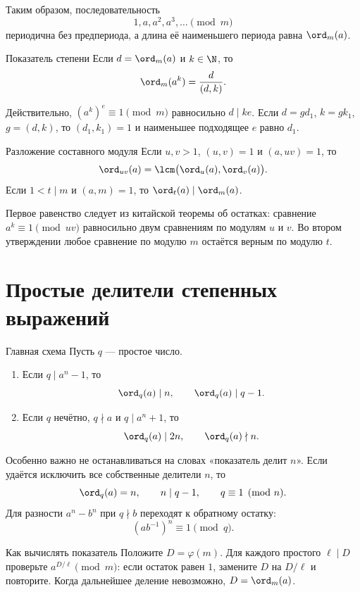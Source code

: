 Таким образом, последовательность
\[
  1,a,a^2,a^3,\ldots\pmod m
\]
периодична без предпериода, а длина её наименьшего периода равна
$\ord_m(a)$.

\begin{theorembox}{Показатель степени}
Если $d=\ord_m(a)$ и $k\in\N$, то
\[
  \ord_m(a^k)=\frac d{(d,k)}.
\]
\end{theorembox}

Действительно, $(a^k)^e\equiv1\pmod m$ равносильно $d\mid ke$.
Если $d=gd_1$, $k=gk_1$, $g=(d,k)$, то $(d_1,k_1)=1$ и наименьшее
подходящее $e$ равно $d_1$.

\begin{theorembox}{Разложение составного модуля}
Если $u,v>1$, $(u,v)=1$ и $(a,uv)=1$, то
\[
  \ord_{uv}(a)
  =\lcm\bigl(\ord_u(a),\ord_v(a)\bigr).
\]
Если $1<t\mid m$ и $(a,m)=1$, то
$\ord_t(a)\mid\ord_m(a)$.
\end{theorembox}

Первое равенство следует из китайской теоремы об остатках: сравнение
$a^k\equiv1\pmod{uv}$ равносильно двум сравнениям по модулям $u$ и
$v$. Во втором утверждении любое сравнение по модулю $m$ остаётся
верным по модулю $t$.

\section{Простые делители степенных выражений}

\begin{theorembox}{Главная схема}
Пусть $q$ --- простое число.
\begin{enumerate}
  \item Если $q\mid a^n-1$, то
        \[
          \ord_q(a)\mid n,
          \qquad
          \ord_q(a)\mid q-1.
        \]
  \item Если $q$ нечётно, $q\nmid a$ и $q\mid a^n+1$, то
        \[
          \ord_q(a)\mid2n,
          \qquad
          \ord_q(a)\nmid n.
        \]
\end{enumerate}
\end{theorembox}

Особенно важно не останавливаться на словах «показатель делит $n$».
Если удаётся исключить все собственные делители $n$, то
\[
  \ord_q(a)=n,
  \qquad n\mid q-1,
  \qquad q\equiv1\pmod n.
\]
Для разности $a^n-b^n$ при $q\nmid b$ переходят к обратному остатку:
\[
  (ab^{-1})^n\equiv1\pmod q.
\]

\begin{methodbox}{Как вычислять показатель}
Положите $D=\varphi(m)$. Для каждого простого $\ell\mid D$ проверьте
$a^{D/\ell}\pmod m$: если остаток равен $1$, замените $D$ на $D/\ell$
и повторите. Когда дальнейшее деление невозможно, $D=\ord_m(a)$.
\end{methodbox}


